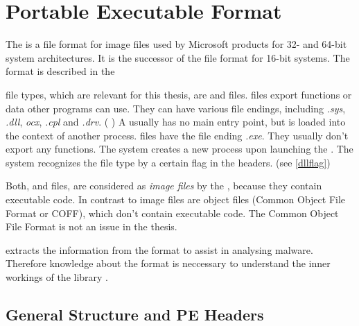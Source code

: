 \chapter{Portable Executable Format} \label{chap:peformat}

The \PE{} is a file format for image files used by Microsoft products for 32- and 64-bit system architectures. It is the successor of the \NZ{} file format for 16-bit systems. The \PE{} format is described in the \PECOFF{} \cite{pespec}

\PE{} file types, which are relevant for this thesis, are \DLL{} and \EXE{} files. \DLL{} files export functions or data other programs can use. They can have various file endings, including \emph{.sys}, \emph{.dll}, \emph{ocx}, \emph{.cpl} and \emph{.drv}. (\cf{} \cite{micrdll}) A \DLL{} usually has no main entry point, but is loaded into the context of another process.
\EXE{} files have the file ending \emph{.exe}. They usually don't export any functions. The system creates a new process upon launching the \EXE{}.
The system recognizes the file type by a certain flag in the \PE{} headers. (see \ref{dllflag})

Both, \EXE{} and \DLL{} files, are considered as \emph{image files} by the \PECOFF{}, because they contain executable code.  In contrast to image files are object files (Common Object File Format or {COFF}), which don't contain executable code. The Common Object File Format is not an issue in the thesis.

\portex{} extracts the information from the \PE{} format to assist in analysing malware. Therefore knowledge about the \PE{} format is neccessary to understand the inner workings of the library \portex{}.

\section{General Structure and PE Headers}

